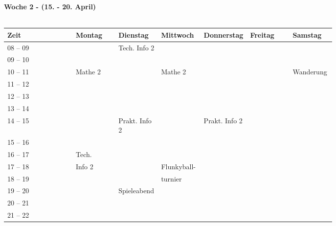 \pagebreak
\textbf{Woche 2 - (15. - 20. April)}\\
\\
\begin{tabular}{|l|p{0.13\linewidth}|p{0.13\linewidth}|p{0.13\linewidth}|p{0.13\linewidth}|p{0.13\linewidth}|p{0.13\linewidth}|} \hline
 Zeit & Montag & Dienstag & Mittwoch & Donnerstag & Freitag & Samstag \\ 
 \hline \hline \cline{3-3}
 08 -- 09 & &\footnotesize{Tech. Info 2} & & & &\\ \cline{1-1}
 09 -- 10 & & & & & &  \\ \cline{1-1} \cline{3-3} \cline{2-2} \cline{4-4}
 10 -- 11 &\footnotesize{Mathe 2} & &\footnotesize{Mathe 2} & & & \cellcolor{lightlightgray} \footnotesize{Wanderung}\\ \cline{1-1}
 11 -- 12 & & & & & &\cellcolor{lightlightgray}\\ \cline{1-1} \cline{2-2} \cline{4-4}
 12 -- 13 & & & & & &\cellcolor{lightlightgray} \\ \cline{1-1} 
 13 -- 14 & & & & & & \cellcolor{lightlightgray} \\ \cline{1-1} \cline{3-3} \cline{5-5}
 14 -- 15 & &\footnotesize{Prakt. Info 2} & &\footnotesize{Prakt. Info 2} & & \cellcolor{lightlightgray} \\ \cline{1-1}
 15 -- 16 & & & & & & \cellcolor{lightlightgray}\\ \cline {1-1} \cline{3-3} \cline{5-5} \cline{2-2}
 16 -- 17 & \footnotesize{Tech.}& & & & & \cellcolor{lightlightgray}\\ \cline{1-1}
 17 -- 18 &\footnotesize{Info 2} & &\cellcolor{lightlightgray} \footnotesize{Flunkyball-} & & & \\ \cline{1-1}
  18 -- 19 & & &\cellcolor{lightlightgray} \footnotesize{turnier}  & & &  \\ \cline{1-2}
 19 -- 20 & &\cellcolor{lightlightgray} \footnotesize{Spieleabend} & \cellcolor{lightlightgray} & & & \\ \cline{1-1}
 20 -- 21 & &\cellcolor{lightlightgray} &\cellcolor{lightlightgray}  & & & \\ \cline{1-1}
 21 -- 22 & &\cellcolor{lightlightgray} & \cellcolor{lightlightgray} & & & \\ \hline
\end{tabular}
\\

